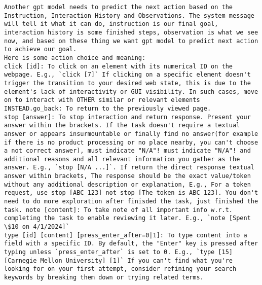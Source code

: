\begin{tcolorbox}[breakable]
\small
\ttfamily
{}
\begin{lstlisting}
Another gpt model needs to predict the next action based on the Instruction, Interaction History and Observations. The system message will tell it what it can do, instruction is our final goal, interaction history is some finished steps, observation is what we see now, and based on these thing we want gpt model to predict next action to achieve our goal. 
Here is some action choice and meaning:
click [id]: To click on an element with its numerical ID on the webpage. E.g., `click [7]` If clicking on a specific element doesn't trigger the transition to your desired web state, this is due to the element's lack of interactivity or GUI visibility. In such cases, move on to interact with OTHER similar or relevant elements INSTEAD.go_back: To return to the previously viewed page.
stop [answer]: To stop interaction and return response. Present your answer within the brackets. If the task doesn't require a textual answer or appears insurmountable or finally find no answer(for example if there is no product processing or no place nearby, you can't choose a not correct answer), must indicate "N/A"! must indicate "N/A"! and additional reasons and all relevant information you gather as the answer. E.g., `stop [N/A ...]`. If return the direct response textual answer within brackets, The response should be the exact value/token without any additional description or explanation, E.g., For a token request, use stop [ABC_123] not stop [The token is ABC_123]. You don't need to do more exploration after finisded the task, just finished the task. note [content]: To take note of all important info w.r.t. completing the task to enable reviewing it later. E.g., `note [Spent \$10 on 4/1/2024]`
type [id] [content] [press_enter_after=0|1]: To type content into a field with a specific ID. By default, the "Enter" key is pressed after typing unless `press_enter_after` is set to 0. E.g., `type [15] [Carnegie Mellon University] [1]` If you can't find what you're looking for on your first attempt, consider refining your search keywords by breaking them down or trying related terms.

\end{lstlisting}
\end{tcolorbox}
